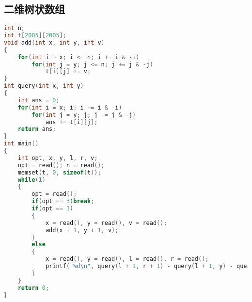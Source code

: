 \subsection{二维树状数组}
\begin{lstlisting}[language=C]
int n;
int t[2005][2005];
void add(int x, int y, int v)
{
	for(int i = x; i <= n; i += i & -i)
		for(int j = y; j <= n; j += j & -j)
			t[i][j] += v;
}
int query(int x, int y)
{
	int ans = 0;
	for(int i = x; i; i -= i & -i)
		for(int j = y; j; j -= j & -j)
			ans += t[i][j];
	return ans;
}
int main()
{
	int opt, x, y, l, r, v;
	opt = read(); n = read();
	memset(t, 0, sizeof(t));
	while(1)
	{
		opt = read();
		if(opt == 3)break;
		if(opt == 1)
		{
			x = read(), y = read(), v = read();
			add(x + 1, y + 1, v);
		}
		else
		{
			x = read(), y = read(), l = read(), r = read();
			printf("%d\n", query(l + 1, r + 1) - query(l + 1, y) - query(x, r + 1) + query(x, y));
		}
	}
	return 0;
}
\end{lstlisting}